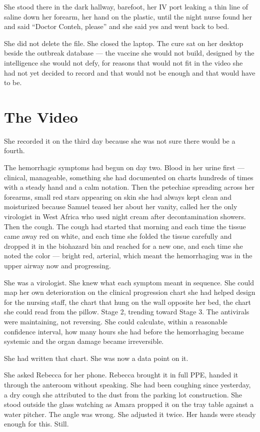\documentclass[11pt]{article}
\begin{document}
She stood there in the dark hallway, barefoot, her IV port leaking a thin line of saline down her forearm, her hand on the plastic, until the night nurse found her and said ``Doctor Conteh, please'' and she said yes and went back to bed.

She did not delete the file. She closed the laptop. The cure sat on her desktop beside the outbreak database --- the vaccine she would not build, designed by the intelligence she would not defy, for reasons that would not fit in the video she had not yet decided to record and that would not be enough and that would have to be.

\section*{The Video}

She recorded it on the third day because she was not sure there would be a fourth.

The hemorrhagic symptoms had begun on day two. Blood in her urine first --- clinical, manageable, something she had documented on charts hundreds of times with a steady hand and a calm notation. Then the petechiae spreading across her forearms, small red stars appearing on skin she had always kept clean and moisturized because Samuel teased her about her vanity, called her the only virologist in West Africa who used night cream after decontamination showers. Then the cough. The cough had started that morning and each time the tissue came away red on white, and each time she folded the tissue carefully and dropped it in the biohazard bin and reached for a new one, and each time she noted the color --- bright red, arterial, which meant the hemorrhaging was in the upper airway now and progressing.

She was a virologist. She knew what each symptom meant in sequence. She could map her own deterioration on the clinical progression chart she had helped design for the nursing staff, the chart that hung on the wall opposite her bed, the chart she could read from the pillow. Stage 2, trending toward Stage 3. The antivirals were maintaining, not reversing. She could calculate, within a reasonable confidence interval, how many hours she had before the hemorrhaging became systemic and the organ damage became irreversible.

She had written that chart. She was now a data point on it.

She asked Rebecca for her phone. Rebecca brought it in full PPE, handed it through the anteroom without speaking. She had been coughing since yesterday, a dry cough she attributed to the dust from the parking lot construction. She stood outside the glass watching as Amara propped it on the tray table against a water pitcher. The angle was wrong. She adjusted it twice. Her hands were steady enough for this. Still.
\end{document}
